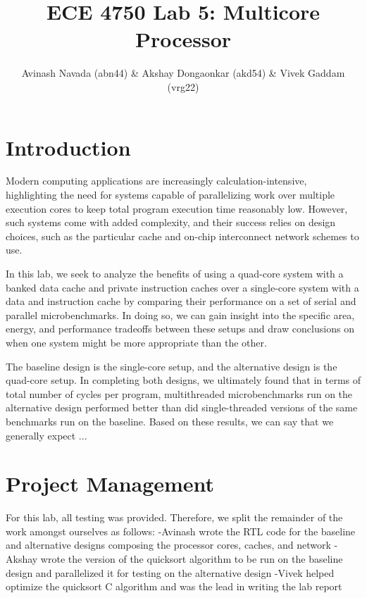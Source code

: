 \documentclass[10pt]{article}
\begin{document}
\title{ECE 4750 Lab 5: Multicore Processor}
\author{Avinash Navada (abn44) \& Akshay Dongaonkar (akd54) 
		\& Vivek Gaddam (vrg22)}
\maketitle


\section{Introduction}

Modern computing applications are increasingly calculation-intensive, highlighting the 
need for systems capable of parallelizing work over multiple execution cores to keep 
total program execution time reasonably low. However, such systems come with
added complexity, and their success relies on design choices, such as the particular
cache and on-chip interconnect network schemes to use. \par

In this lab, we seek to analyze the benefits of using a quad-core system with
a banked data cache and private instruction caches over a single-core system with a data
and instruction cache by comparing their performance on a set of serial and parallel microbenchmarks.
In doing so, we can gain insight into the specific area, energy, and performance tradeoffs between these setups
and draw conclusions on when one system might be more appropriate than the other.

The baseline design is the single-core setup, and the alternative design is the quad-core setup.
In completing both designs, we ultimately found that in terms of total number of cycles per program, multithreaded microbenchmarks run on the alternative design performed better than did single-threaded versions of the same benchmarks run on the baseline.
Based on these results, we can say that we generally expect ...



\section{Project Management}

% 
For this lab, all testing was provided. Therefore, we split the remainder of the work amongst ourselves as follows:
-Avinash wrote the RTL code for the baseline and alternative designs composing the processor cores, caches, and network
-Akshay wrote the version of the quicksort algorithm to be run on the baseline design and parallelized it for testing on the alternative design
-Vivek helped optimize the quicksort C algorithm and was the lead in writing the lab report
\end{document}
